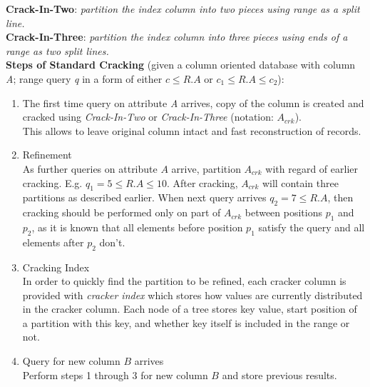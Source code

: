 \documentclass[10pt, conference, compsocconf]{IEEEtran}
\begin{document}
\textbf{Crack-In-Two}: \textit{partition the index column into two pieces using range as a split line.}\\

\textbf{Crack-In-Three}: \textit{partition the index column into three pieces using ends of a range as two split lines.}\\

\textbf{Steps of Standard Cracking} (given a column oriented database with column \textit{A}; range query \textit{q} in a form of either \textit{$c \leq R.A$} or \textit{$c_1 \leq R.A \leq c_2$}): \\
\begin{enumerate}
\item{The first time query on attribute \textit{A} arrives, copy of the column is created and cracked using \emph{Crack-In-Two} or \emph{Crack-In-Three} (notation:  $A_{crk}$}).\\
This allows to leave original column intact and fast reconstruction of records. \\
\item{Refinement}\\
As further queries on attribute $A$ arrive, partition $A_{crk}$ with regard of earlier cracking. E.g. $q_1 = 5 \leq R.A \leq 10$. After cracking, $A_{crk}$ will contain three partitions as described earlier. When next query arrives $q_2 = 7 \leq R.A$, then cracking should be performed only on part of $A_{crk}$ between positions $p_1$ and $p_2$, as it is known that all elements before position $p_1$ satisfy the query and all elements after $p_2$ don't.\\
\item{Cracking Index}\\
In order to quickly find the partition to be refined, each cracker column is provided with \textit{cracker index} which stores how values are currently distributed in the cracker column. Each node of a tree stores key value, start position of a partition with this key, and whether key itself is included in the range or not.\\
\item{Query for new column $B$ arrives}\\
Perform steps 1 through 3 for new column $B$ and store previous results.
\end{enumerate}
\end{document}
